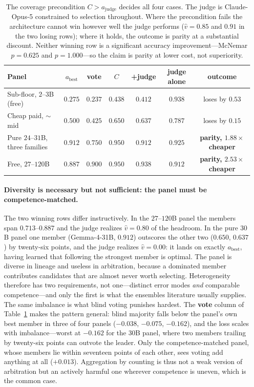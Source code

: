 \documentclass[manuscript,screen,review]{acmart}
\begin{document}
\begin{table}[t]
\caption{The coverage precondition $C>a_{\mathrm{judge}}$ decides all four cases.
The judge is Claude-Opus-5 constrained to selection throughout. Where the
precondition fails the architecture cannot win however well the judge performs
($\hat v=0.85$ and $0.91$ in the two losing rows); where it holds, the outcome is
parity at a substantial discount. Neither winning row is a significant accuracy
improvement---McNemar $p=0.625$ and $p=1.000$---so the claim is parity at lower
cost, not superiority.}
\label{tab:precond}
\small
\begin{tabular}{@{}lcccccc@{}}
\toprule
\textbf{Panel} & $a_{\mathrm{best}}$ & \textbf{vote} & $C$ & \textbf{+judge} & \textbf{judge alone} & \textbf{outcome} \\
\midrule
Sub-floor, $2$--$3$B (free)      & $0.275$ & $0.237$ & $0.438$ & $0.412$ & $0.938$ & loses by $0.53$ \\
Cheap paid, $\sim$mid            & $0.500$ & $0.425$ & $0.650$ & $0.637$ & $0.787$ & loses by $0.15$ \\
Pure $24$--$31$B, three families & $0.912$ & $0.750$ & $0.950$ & $0.912$ & $0.925$ & \textbf{parity, $1.88\times$ cheaper} \\
Free, $27$--$120$B               & $0.887$ & $0.900$ & $0.950$ & $0.938$ & $0.912$ & \textbf{parity, $2.53\times$ cheaper} \\
\bottomrule
\end{tabular}
\end{table}

\paragraph{Diversity is necessary but not sufficient: the panel must be
competence-matched.} The two winning rows differ instructively. In the
$27$--$120$B panel the members span $0.713$--$0.887$ and the judge realizes
$\hat v=0.80$ of the headroom. In the pure $30$B panel one member (Gemma-4-31B,
$0.912$) outscores the other two ($0.650$, $0.637$) by twenty-six points, and the
judge realizes $\hat v=0.00$: it lands on exactly $a_{\mathrm{best}}$, having
learned that following the strongest member is optimal. The panel is diverse in
lineage and useless in arbitration, because a dominated member contributes
candidates that are almost never worth selecting. Heterogeneity therefore has two
requirements, not one---distinct error modes \emph{and} comparable competence---and
only the first is what the ensembles literature usually supplies. The same
imbalance is what blind voting punishes hardest. The \textbf{vote} column of
Table~\ref{tab:precond} makes the pattern general: blind majority falls below the
panel's own best member in three of four panels ($-0.038$, $-0.075$, $-0.162$),
and the loss scales with imbalance---worst at $-0.162$ for the $30$B panel, where
two members trailing by twenty-six points can outvote the leader. Only the
competence-matched panel, whose members lie within seventeen points of each other,
sees voting add anything at all ($+0.013$). Aggregation by counting is thus not a
weak version of arbitration but an actively harmful one wherever competence is
uneven, which is the common case.
\end{document}
